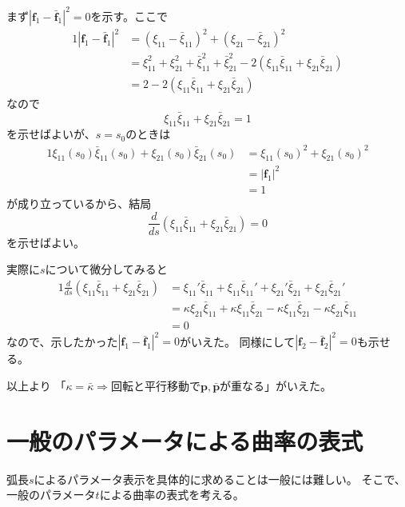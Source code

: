 \documentclass[a4j,disablejfam,dvipdfmx,papersize,slide,uplatex,21pt]{jsarticle}
\makeatletter
\renewenvironment{proof}[1][\proofname]{\par
        \pushQED{\qed}
        \normalfont
        \topsep6\p@\@plus6\p@ \trivlist
        \item[\hskip\labelsep{\bfseries #1}\@addpunct{\bfseries}]\ignorespaces
    }{%
        \popQED\endtrivlist\@endpefalse
    }
\renewcommand{\proofname}{証明.}
\makeatother
\begin{document}
\begin{proof}
    \newpage
    まず$|\bm{f}_1 - \bar{\bm{f}}_1|^2 = 0$を示す。ここで
    \begin{alignat}{1}
        |\bm{f}_1 - \bar{\bm{f}}_1|^2
            &= (\xi_{11} - \bar{\xi}_{11})^2 + (\xi_{21} - \bar{\xi}_{21})^2 \\
            &= \xi_{11}^2 + \xi_{21}^2 + \bar{\xi}_{11}^2 + \bar{\xi}_{21}^2
                - 2 (\xi_{11} \bar{\xi}_{11} + \xi_{21} \bar{\xi}_{21}) \\
            &= 2 - 2 (\xi_{11} \bar{\xi}_{11} + \xi_{21} \bar{\xi}_{21})
    \end{alignat}
    なので
    \begin{equation}
        \xi_{11} \bar{\xi}_{11} + \xi_{21} \bar{\xi}_{21} = 1
    \end{equation}
    を示せばよいが、$s = s_0$のときは
    \begin{alignat}{1}
        \xi_{11}(s_0) \bar{\xi}_{11}(s_0) + \xi_{21}(s_0) \bar{\xi}_{21}(s_0)
            &= \xi_{11}(s_0)^2 + \xi_{21}(s_0)^2 \\
            &= |\bm{f}_1|^2 \\
            &= 1
    \end{alignat}
    が成り立っているから、結局
    \begin{equation}
        \frac{d}{ds} (\xi_{11} \bar{\xi}_{11} + \xi_{21} \bar{\xi}_{21}) = 0
    \end{equation}
    を示せばよい。

    \newpage
    実際に$s$について微分してみると
    \begin{alignat}{1}
        \frac{d}{ds} (\xi_{11} \bar{\xi}_{11} + \xi_{21} \bar{\xi}_{21})
            &= \xi_{11}' \bar{\xi}_{11} + \xi_{11} \bar{\xi}_{11}'
                + \xi_{21}' \bar{\xi}_{21} + \xi_{21} \bar{\xi}_{21}' \\
            &= \kappa \xi_{21} \bar{\xi}_{11} + \kappa \xi_{11} \bar{\xi}_{21}
                - \kappa \xi_{11} \bar{\xi}_{21} - \kappa \xi_{21} \bar{\xi}_{11} \\
            &= 0
    \end{alignat}
    なので、示したかった$|\bm{f}_1 - \bar{\bm{f}}_1|^2 = 0$がいえた。
    同様にして$|\bm{f}_2 - \bar{\bm{f}}_2|^2 = 0$も示せる。

    以上より
    「$\kappa = \bar{\kappa} \Rightarrow \text{回転と平行移動で$\bm{p}, \bar{\bm{p}}$が重なる}$」がいえた。
\end{proof}




\section{一般のパラメータによる曲率の表式}
弧長$s$によるパラメータ表示を具体的に求めることは一般には難しい。
そこで、一般のパラメータ$t$による曲率の表式を考える。
\end{document}
